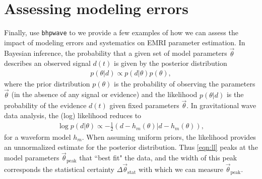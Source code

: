 \documentclass[%
 reprint,
 nofootinbib,
 amsmath,amssymb,
 aps,
 prd,
]{revtex4-2}
\begin{document}




\section{Assessing modeling errors}
\label{sec:errors}

Finally, use \texttt{bhpwave} to we provide a few examples of how we can assess the impact of modeling errors and systematics on EMRI parameter estimation. In Bayesian inference, the probability that a given set of model parameters $\vec{\theta}$ describes an observed signal $d(t)$ is given by the posterior distribution
\begin{align}
    p(\theta | d) \propto p(d|\theta) p(\theta),
\end{align}
where the prior distribution $p(\theta)$ is the probability of observing the parameters $\vec{\theta}$ (in the absence of any signal or evidence) and the likelihood $p(\theta |d)$ is the probability of the evidence $d(t)$ given fixed parameters $\vec{\theta}$. In gravitational wave data analysis, the (log) likelihood reduces to \cite{Whittle1957}
\begin{align} \label{eqn:ll}
    \log p(d|\theta) \propto -\frac{1}{2}(d - h_m(\theta)| d- h_m(\theta)),
\end{align}
for a waveform model $h_m$. When assuming uniform priors, the likelihood provides an unnormalized estimate for the posterior distribution. Thus \eqref{eqn:ll} peaks at the model parameters $\vec{\theta}_\mathrm{peak}$ that ``best fit" the data, and the width of this peak corresponds the statistical certainty $\Delta \vec{\theta}_\mathrm{stat}$ with which we can measure $\vec{\theta}_\mathrm{peak}$. 
\end{document}
